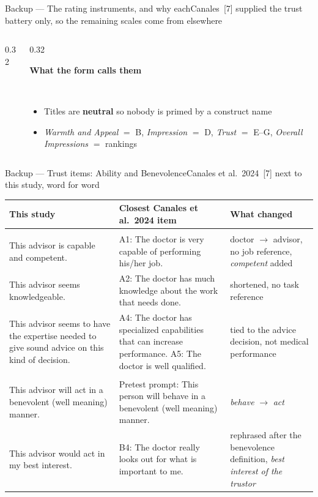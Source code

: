 \documentclass[aspectratio=169,10pt]{beamer}
\newcommand{\hl}[1]{{\color{knblue}\textbf{#1}}}
\newcommand{\panelheadsm}[1]{\noindent\colorbox{kncyan}{\parbox{0.96\textwidth}{\centering\vspace{1pt}\color{white}\tiny\bfseries #1\vspace{1pt}}}\\[0.2em]}
\newcommand{\panel}[1]{\noindent\colorbox{knlight}{\parbox{0.96\textwidth}{\vspace{2pt}\scriptsize
\begin{itemize}\setlength{\itemsep}{0.2em}\setlength{\leftmargini}{1.1em}#1\end{itemize}\vspace{2pt}}}}
\begin{document}
\begin{frame}{Backup — The rating instruments, and why each}{Canales~[7] supplied the trust battery only, so the remaining scales come from elsewhere}
\begin{columns}[T]
\begin{column}{0.32\textwidth}
    \end{column}
    \begin{column}{0.32\textwidth}
      \panelheadsm{What the form calls them}
      \panel{%
        \item Titles are \hl{neutral} so nobody is primed by a construct name
        \item \emph{Warmth and Appeal} $=$ B, \emph{Impression} $=$ D, \emph{Trust} $=$ E--G, \emph{Overall Impressions} $=$ rankings}
    \end{column}
  \end{columns}
\end{frame}

\begin{frame}{Backup — Trust items: Ability and Benevolence}{Canales et al.\ 2024~[7] next to this study, word for word}
  \vspace{0.1em}
  {\tiny
  \setlength{\tabcolsep}{4pt}\renewcommand{\arraystretch}{1.35}
  \begin{tabular}{@{}>{\raggedright\arraybackslash}m{}>{\raggedright\arraybackslash}m{}>{\raggedright\arraybackslash}m{}@{}}
    \toprule
    \textbf{This study} & \textbf{Closest Canales et al.\ 2024 item} & \textbf{What changed} \\
    \midrule
    \multicolumn{3}{@{}l}{\textbf{\color{knblue}Ability}} \\
    This advisor is capable and competent. & A1: The doctor is very capable of performing his/her job. & doctor $\to$ advisor, no job reference, \emph{competent} added \\
    This advisor seems knowledgeable. & A2: The doctor has much knowledge about the work that needs done. & shortened, no task reference \\
    This advisor seems to have the expertise needed to give sound advice on this kind of decision. & A4: The doctor has specialized capabilities that can increase performance. \newline A5: The doctor is well qualified. & tied to the advice decision, not medical performance \\
    \midrule
    \multicolumn{3}{@{}l}{\textbf{\color{knblue}Benevolence}} \\
    This advisor will act in a benevolent (well meaning) manner. & Pretest prompt: This person will behave in a benevolent (well meaning) manner. & \emph{behave} $\to$ \emph{act} \\
    This advisor would act in my best interest. & B4: The doctor really looks out for what is important to me. & rephrased after the benevolence definition, \emph{best interest of the trustor} \\

\end{tabular}}
\end{frame}
\end{document}
